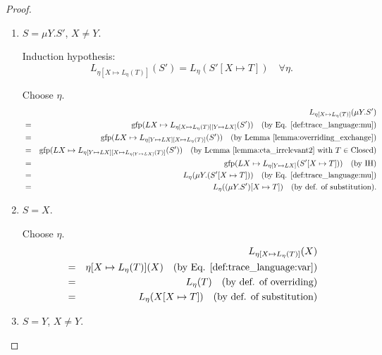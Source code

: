 \documentclass{llncs}
\newcommand*{\gfp}{\mathrm{gfp}}
\newcommand*{\Closed}{\mathrm{Closed}}
\renewcommand*{\|}{\;|\;}
\begin{document}
\begin{proof}
\begin{enumerate}
    \item
      \label{case:substitution_trace_language:mu2}
      $S = \mu Y.S'$, $X \neq Y$.

      Induction hypothesis:
      \begin{equation*}
        L_{\eta[X \mapsto L_\eta(T)]}(S') = L_\eta(S'[X \mapsto T]) \quad \forall \eta.
      \end{equation*}

      Choose $\eta$.
      \begin{eqnarray*}
        &&  L_{\eta[X \mapsto L_\eta(T)]}(\mu Y.S') \\
        &=& \gfp(LX \mapsto L_{\eta[X \mapsto L_\eta(T)][Y \mapsto LX]}(S'))
            \quad \text{(by Eq. \ref{def:trace_language:mu})} \\
        &=& \gfp(LX \mapsto L_{\eta[Y \mapsto LX][X \mapsto L_\eta(T)]}(S'))
            \quad \text{(by Lemma \ref{lemma:overriding_exchange})} \\
        &=& \gfp(LX \mapsto L_{\eta[Y \mapsto LX][X \mapsto L_{\eta[Y \mapsto LX]}(T)]}(S'))
            \quad \text{(by Lemma \ref{lemma:eta_irrelevant2} with $T \in \Closed$)} \\
        &=& \gfp(LX \mapsto L_{\eta[Y \mapsto LX]}(S'[X \mapsto T]))
            \quad \text{(by IH)} \\
        &=& L_\eta(\mu Y.(S'[X \mapsto T]))
            \quad \text{(by Eq. \ref{def:trace_language:mu})} \\
        &=& L_\eta((\mu Y.S')[X \mapsto T])
            \quad \text{(by def. of substitution)}. \\
      \end{eqnarray*}

    \item
      \label{case:substitution_trace_language:var1}
      $S = X$.

      Choose $\eta$.
      \begin{eqnarray*}
        &&  L_{\eta[X \mapsto L_\eta(T)]}(X) \\
        &=& \eta[X \mapsto L_\eta(T)](X)
            \quad \text{(by Eq. \ref{def:trace_language:var})} \\
        &=& L_\eta(T)
            \quad \text{(by def. of overriding)} \\
        &=& L_\eta(X[X \mapsto T])
            \quad \text{(by def. of substitution)}
      \end{eqnarray*}

    \item
      \label{case:substitution_trace_language:var2}
      $S = Y$, $X \neq Y$.


\end{enumerate}
\end{proof}
\end{document}
